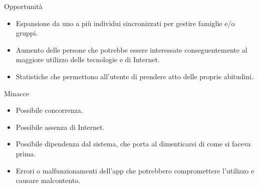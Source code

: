 \documentclass[a4paper,12pt]{article}
\begin{document}
{\sffamily  Opportunità}
\begin{itemize} \setlength\itemsep{0.01em}

\item Espansione da uno a più individui sincronizzati per gestire famiglie e/o gruppi.
\item Aumento delle persone che potrebbe essere interessate conseguentemente al maggiore utilizzo delle tecnologie e di Internet.
\item Statistiche che permettono all'utente di prendere atto delle proprie abitudini.
\end{itemize}

{\sffamily  Minacce}
\begin{itemize} \setlength\itemsep{0.01em}

\item Possibile concorrenza.
\item Possibile assenza di Internet.
\item Possibile dipendenza dal sistema, che porta al dimenticarsi di come si faceva prima.
\item Errori o malfunzionamenti dell'app che potrebbero compromettere l'utilizzo e causare malcontento.
\end{itemize}

\newpage
\end{document}
